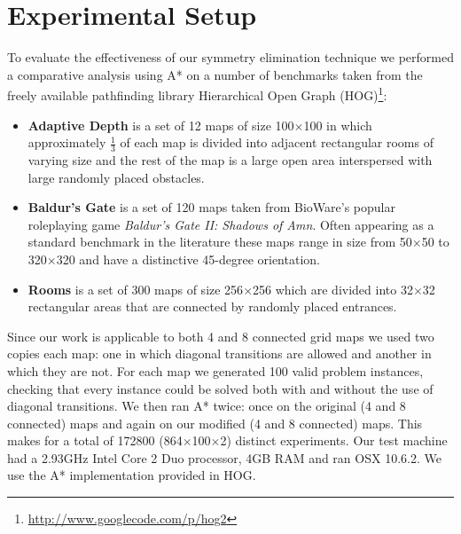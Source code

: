 \section{Experimental Setup}
To evaluate the effectiveness of our symmetry elimination technique we performed
a comparative analysis using A* on a number of benchmarks taken from
the freely available pathfinding library 
Hierarchical Open Graph (HOG)\footnote{\url{http://www.googlecode.com/p/hog2}}:
\begin{itemize}
\item{\textbf{Adaptive Depth} is a set of 12 maps of size 100$\times$100 in which approximately
$\frac{1}{3}$ of each map is divided into adjacent rectangular rooms of
varying size and the rest of the map is a large open area interspersed with 
large randomly placed obstacles.}
\item{\textbf{Baldur's Gate} is a set of 120 maps taken from BioWare's popular
roleplaying game \emph{Baldur's Gate II: Shadows of Amn}. 
Often appearing as a standard benchmark in the literature 
\cite{botea04,bjornsson05,bjornsson06,sturtevant05,harabor08} these maps range in 
size from 50$\times$50 to 320$\times$320 and have a distinctive 45-degree orientation.}
\item{\textbf{Rooms} is a set of 300 maps of size 256$\times$256 which are divided into 32$\times$32
rectangular areas that are connected by randomly placed entrances.}
\end{itemize}

Since our work is applicable to both 4 and 8 connected grid maps we used two
copies each map: one in which diagonal transitions are allowed and another
in which they are not.
For each map we generated 100 valid problem instances, checking that every
instance could be solved both with and without the use of diagonal
transitions.
We then ran A* twice: once on the original (4 and 8 connected) maps and again 
on our modified (4 and 8 connected) maps. 
This makes for a total of 172800 (864$\times$100$\times$2) distinct experiments.
Our test machine had a 2.93GHz Intel Core 2 Duo processor, 4GB RAM and
ran OSX 10.6.2.
We use the A* implementation provided in HOG.
